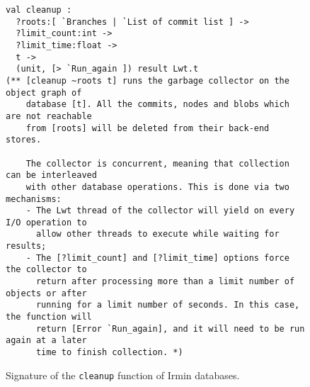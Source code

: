 \begin{figure}[ht]
  \caption{Signature of the \texttt{cleanup} function of Irmin databases.}
  \label{lst:cleanup-sig}

  \centering
  \vspace{-1em}
  \begin{verbatim}
val cleanup :
  ?roots:[ `Branches | `List of commit list ] ->
  ?limit_count:int ->
  ?limit_time:float ->
  t ->
  (unit, [> `Run_again ]) result Lwt.t
(** [cleanup ~roots t] runs the garbage collector on the object graph of
    database [t]. All the commits, nodes and blobs which are not reachable
    from [roots] will be deleted from their back-end stores.

    The collector is concurrent, meaning that collection can be interleaved
    with other database operations. This is done via two mechanisms:
    - The Lwt thread of the collector will yield on every I/O operation to
      allow other threads to execute while waiting for results;
    - The [?limit_count] and [?limit_time] options force the collector to
      return after processing more than a limit number of objects or after
      running for a limit number of seconds. In this case, the function will
      return [Error `Run_again], and it will need to be run again at a later
      time to finish collection. *)
    \end{verbatim}
\end{figure}

